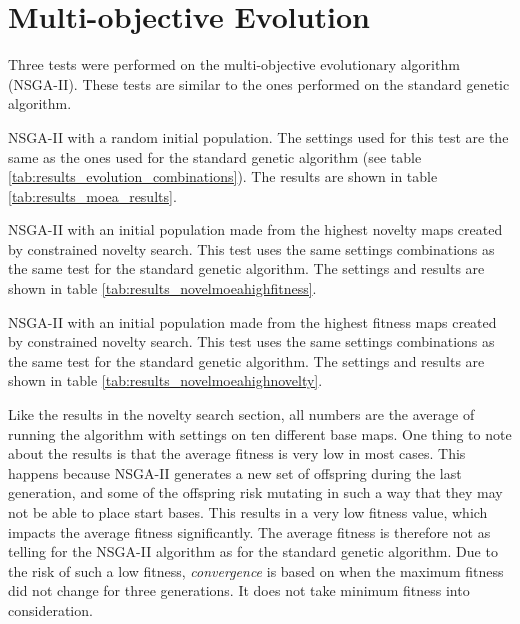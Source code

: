 \section{Multi-objective Evolution}
\label{results_moea}

Three tests were performed on the multi-objective evolutionary algorithm (NSGA-II). These tests are similar to the ones performed on the standard genetic algorithm.

\begin{my_itemize}

	\item NSGA-II with a random initial population. The settings used for this test are the same as the ones used for the standard genetic algorithm (see table \ref{tab:results_evolution_combinations}). The results are shown in table \ref{tab:results_moea_results}.

	\item NSGA-II with an initial population made from the highest novelty maps created by constrained novelty search. This test uses the same settings combinations as the same test for the standard genetic algorithm. The settings and results are shown in table \ref{tab:results_novelmoeahighfitness}.

	\item NSGA-II with an initial population made from the highest fitness maps created by constrained novelty search. This test uses the same settings combinations as the same test for the standard genetic algorithm. The settings and results are shown in table \ref{tab:results_novelmoeahighnovelty}.

\end{my_itemize}

Like the results in the novelty search section, all numbers are the average of running the algorithm with settings on ten different base maps. One thing to note about the results is that the average fitness is very low in most cases. This happens because NSGA-II generates a new set of offspring during the last generation, and some of the offspring risk mutating in such a way that they may not be able to place start bases. This results in a very low fitness value, which impacts the average fitness significantly. The average fitness is therefore not as telling for the NSGA-II algorithm as for the standard genetic algorithm. Due to the risk of such a low fitness, \textit{convergence} is based on when the maximum fitness did not change for three generations. It does not take minimum fitness into consideration.

